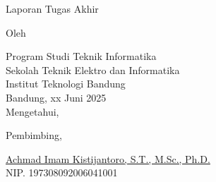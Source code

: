 \clearpage
\pagestyle{empty}

\begin{center}
    \smallskip
    
    \Large \bfseries \MakeUppercase{\thetitle}
    \vfill
    
    \Large Laporan Tugas Akhir
    \vfill
    
    \large Oleh
    
    \Large \theauthor
    
    \large Program Studi Teknik Informatika \\
    
    \normalsize \normalfont
    Sekolah Teknik Elektro dan Informatika \\
    Institut Teknologi Bandung \\
    
    \vfill
    \normalsize \normalfont
    Bandung, xx Juni 2025 \\
    Mengetahui,
    
    \vspace{0.5cm}
    Pembimbing,
    
    \vfill
    \underline{Achmad Imam Kistijantoro, S.T., M.Sc., Ph.D.} \\
    NIP. 197308092006041001
    
\end{center}
\clearpage
